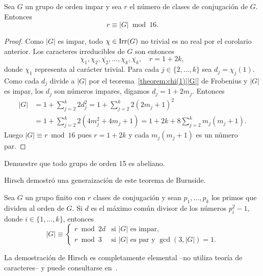 \begin{theorem}[Burnside]
  Sea $G$ un grupo de orden impar y sea $r$ el número de clases de conjugación
  de $G$. Entonces 
  \[
	  r\equiv|G|\bmod{16}.
  \]
\end{theorem}

\begin{proof}
  Como $|G|$ es impar, todo $\chi\in\operatorname{Irr}(G)$ no trivial es no real por el
  corolario anterior. Los caracteres irreducibles de $G$ son entonces 
  \[
    \chi_1,\chi_2,\overline{\chi_2},\dots,\chi_k,\overline{\chi_k},
    \quad
    r=1+2k,
  \]
  donde $\chi_1$ representa al carácter trivial. 
  Para cada $j\in\{2,\dots,k\}$ sea $d_j=\chi_j(1)$.   Como cada $d_j$ divide a
  $|G|$ por el teorema~\ref{theorem:chi(1)||G|} de Frobenius y $|G|$ es impar, los $d_j$ son
  números impares, digamos $d_j=1+2m_j$. Entonces 
  \begin{align*}
    |G|&=1+\sum_{j=2}^k 2d_j^2=1+\sum_{j=2}^k2(2m_j+1)^2\\
    &=1+\sum_{j=2}^k2(4m_j^2+4m_j+1)
    =1+2k+8\sum_{j=2}^km_j(m_j+1).
  \end{align*}
  Luego $|G|\equiv r\bmod{16}$ pues $r=1+2k$ y cada $m_j(m_j+1)$ es un número par. 
\end{proof}

\begin{exercise}
Demuestre que todo grupo de orden 15 es abeliano.
\end{exercise}

Hirsch demostró una generaización de este teorema de Burnside. 

\begin{theorem}[Hirsch]
Sea $G$ un grupo finito con $r$ clases de conjugación y sean 
$p_1,\dots,p_k$ los primos que dividen al orden de $G$. Si 
$d$ es el máximo común divisor de los números $p_i^2-1$, donde $i\in\{1,\dots,k\}$, 
entonces
\[
|G|\equiv\begin{cases}
r\bmod 2d&\text{si $|G|$ es impar},\\
r\bmod 3&\text{si $|G|$ es par y $\gcd(3,|G|)=1$.}
\end{cases}
\]
\end{theorem}

La demostración de Hirsch es completamente elemental --no utiliza teoría de caracteres-- 
y puede consultarse en~\cite{MR36755}. 



